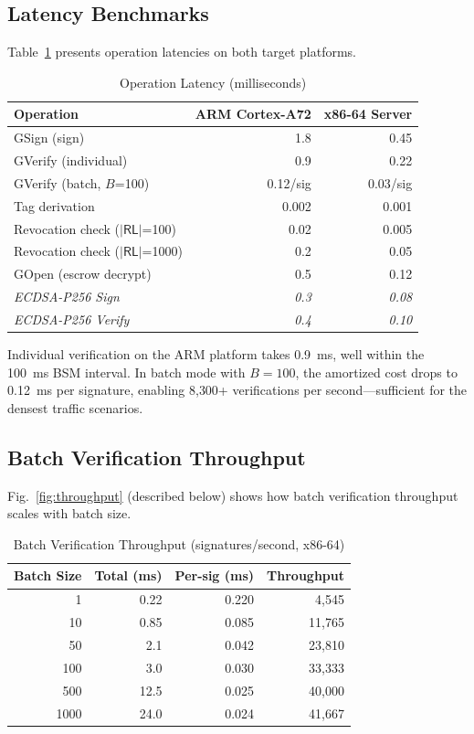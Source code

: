 \documentclass[conference,10pt]{IEEEtran}
\begin{document}
\subsection{Latency Benchmarks}

Table~\ref{tab:latency} presents operation latencies on both target platforms.

\begin{table}[t]
\centering
\caption{Operation Latency (milliseconds)}
\label{tab:latency}
\begin{tabular}{@{}lrr@{}}
\toprule
\textbf{Operation} & \textbf{ARM Cortex-A72} & \textbf{x86-64 Server} \\
\midrule
GSign (sign)           & 1.8  & 0.45 \\
GVerify (individual)   & 0.9  & 0.22 \\
GVerify (batch, $B$=100) & 0.12/sig & 0.03/sig \\
Tag derivation         & 0.002 & 0.001 \\
Revocation check ($|\mathsf{RL}|$=100) & 0.02 & 0.005 \\
Revocation check ($|\mathsf{RL}|$=1000) & 0.2  & 0.05 \\
GOpen (escrow decrypt) & 0.5  & 0.12 \\
\midrule
\textit{ECDSA-P256 Sign}  & \textit{0.3} & \textit{0.08} \\
\textit{ECDSA-P256 Verify} & \textit{0.4} & \textit{0.10} \\
\bottomrule
\end{tabular}
\end{table}

Individual verification on the ARM platform takes 0.9~ms, well within the 100~ms BSM interval. In batch mode with $B = 100$, the amortized cost drops to 0.12~ms per signature, enabling 8{,}300+ verifications per second---sufficient for the densest traffic scenarios.

\subsection{Batch Verification Throughput}

Fig.~\ref{fig:throughput} (described below) shows how batch verification throughput scales with batch size.

\begin{table}[t]
\centering
\caption{Batch Verification Throughput (signatures/second, x86-64)}
\label{tab:throughput}
\begin{tabular}{@{}rrrr@{}}
\toprule
\textbf{Batch Size} & \textbf{Total (ms)} & \textbf{Per-sig (ms)} & \textbf{Throughput} \\
\midrule
1    & 0.22  & 0.220 & 4{,}545 \\
10   & 0.85  & 0.085 & 11{,}765 \\
50   & 2.1   & 0.042 & 23{,}810 \\
100  & 3.0   & 0.030 & 33{,}333 \\
500  & 12.5  & 0.025 & 40{,}000 \\
1000 & 24.0  & 0.024 & 41{,}667 \\
\bottomrule
\end{tabular}
\end{table}
\end{document}
